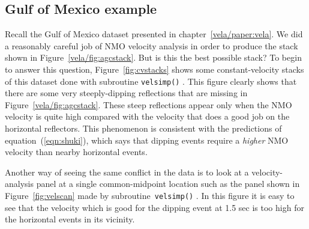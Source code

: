 \subsection{Gulf of Mexico example}
\par
Recall the Gulf of Mexico dataset presented in chapter~\ref{vela/paper:vela}.
We did a reasonably careful job of NMO velocity analysis
in order to produce the stack shown in Figure~\ref{vela/fig:agcstack}.
But is this the best possible stack?
To begin to answer this question, Figure~\ref{fig:cvstacks} shows
some constant-velocity stacks of this dataset done with subroutine
\texttt{velsimp()} .
This figure clearly shows that
there are some very steeply-dipping reflections
that are missing in Figure~\ref{vela/fig:agcstack}.
These steep reflections appear only when the NMO velocity
is quite high compared with the velocity
that does a good job on the horizontal reflectors.
This phenomenon is consistent with 
the predictions of equation~(\ref{eqn:shuki}),
which says that dipping events 
require a {\em higher} NMO velocity than nearby horizontal events.
\newslide
%
\par
Another way of seeing the same conflict in the data
is to look at a velocity-analysis panel
at a single common-midpoint location
such as the panel shown in Figure~\ref{fig:velscan}
made by subroutine~\texttt{velsimp()} .
In this figure it is easy to see that the velocity
which is good for the dipping event at 1.5 sec is too high
for the horizontal events in its vicinity.
%
\newslide

